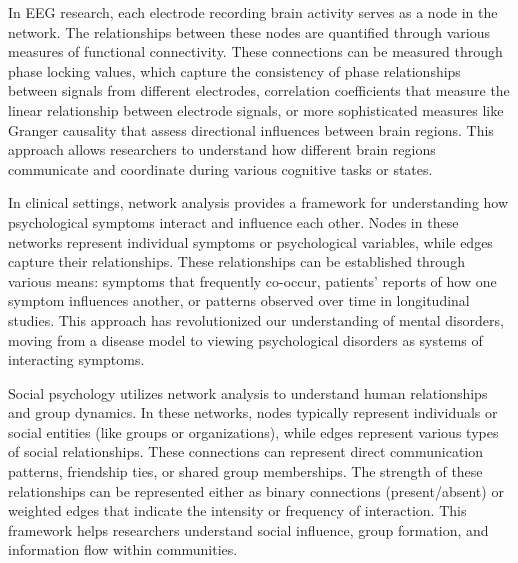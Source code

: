 \begin{figure}[h]
\begin{tcolorbox}[halign=center, drop shadow, title=Binary \& Weighted Adjacency Matrices ,colback=white,colframe=WMgreen,
  colbacktitle=WMgreen,]
  \label{fig:MatrixTypes}
 \end{tcolorbox}
 \end{figure}
 

In EEG research, each electrode recording brain activity serves as a node in the network. The relationships between these nodes are quantified through various measures of functional connectivity. These connections can be measured through phase locking values, which capture the consistency of phase relationships between signals from different electrodes, correlation coefficients that measure the linear relationship between electrode signals, or more sophisticated measures like Granger causality that assess directional influences between brain regions. This approach allows researchers to understand how different brain regions communicate and coordinate during various cognitive tasks or states.

In clinical settings, network analysis provides a framework for understanding how psychological symptoms interact and influence each other. Nodes in these networks represent individual symptoms or psychological variables, while edges capture their relationships. These relationships can be established through various means: symptoms that frequently co-occur, patients' reports of how one symptom influences another, or patterns observed over time in longitudinal studies. This approach has revolutionized our understanding of mental disorders, moving from a disease model to viewing psychological disorders as systems of interacting symptoms.

Social psychology utilizes network analysis to understand human relationships and group dynamics. In these networks, nodes typically represent individuals or social entities (like groups or organizations), while edges represent various types of social relationships. These connections can represent direct communication patterns, friendship ties, or shared group memberships. The strength of these relationships can be represented either as binary connections (present/absent) or weighted edges that indicate the intensity or frequency of interaction. This framework helps researchers understand social influence, group formation, and information flow within communities.

